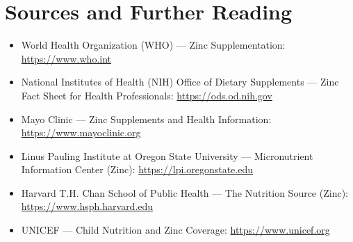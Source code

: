 \section*{Sources and Further Reading}
\begin{itemize}
    \item World Health Organization (WHO) --- Zinc Supplementation: \url{https://www.who.int}
    \item National Institutes of Health (NIH) Office of Dietary Supplements --- Zinc Fact Sheet for Health Professionals: \url{https://ods.od.nih.gov}
    \item Mayo Clinic --- Zinc Supplements and Health Information: \url{https://www.mayoclinic.org}
    \item Linus Pauling Institute at Oregon State University --- Micronutrient Information Center (Zinc): \url{https://lpi.oregonstate.edu}
    \item Harvard T.H. Chan School of Public Health --- The Nutrition Source (Zinc): \url{https://www.hsph.harvard.edu}
    \item UNICEF --- Child Nutrition and Zinc Coverage: \url{https://www.unicef.org}
\end{itemize}